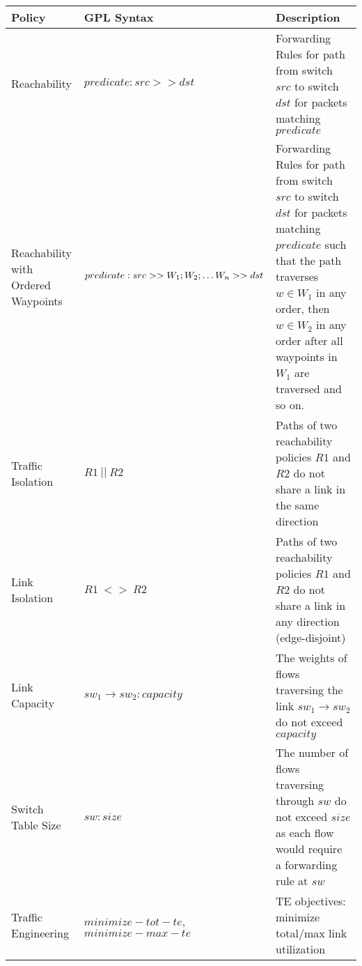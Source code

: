 \begin{table*}[thb]
\begin{small}
	\begin{center}
		\begin{tabular}{m{7em} | m{14em} | m{35em} } 
			Policy &  GPL Syntax & Description \\ 
			\hline
			Reachability & 	$predicate : src >> dst$ & Forwarding Rules for path from switch $src$ to switch $dst$ for packets matching $predicate$ \\
			\hline
			Reachability with Ordered Waypoints & $predicate :\newline src >> W_1;W_2; \ldots W_n >> dst$ & Forwarding Rules for path from switch $src$ to switch $dst$ for packets matching $predicate$ such that the path traverses $w \in W_1$ in any order, then $w \in W_2$ in any order after all waypoints in $W_1$ are traversed and so on.\\  
			\hline
			Traffic \newline Isolation & $R1 \ || \ R2$ & Paths of two reachability policies $R1$ and $R2$ do not share a link in the same direction \\
			\hline
			Link \newline Isolation & $R1 \ <> \ R2$ & Paths of two reachability policies $R1$ and $R2$ do not share a link in any direction (edge-disjoint) \\
			\hline
			Link \newline Capacity & $sw_1 \rightarrow sw_2 : capacity$  & The weights of flows traversing the link $sw_1 \rightarrow sw_2$ do not exceed $capacity$\\
			\hline
			Switch \newline Table Size & $sw : size$ & The number of flows traversing through $sw$ do not exceed $size$ as each flow would require a forwarding rule at $sw$ \\
			\hline
			Traffic \newline Engineering & $minimize-tot-te$,\newline $minimize-max-te$ & TE objectives: minimize total/max link utilization \\
		\end{tabular}
	\end{center}
	 \label{tab:policysupport} 
\end{small}
\end{table*}


